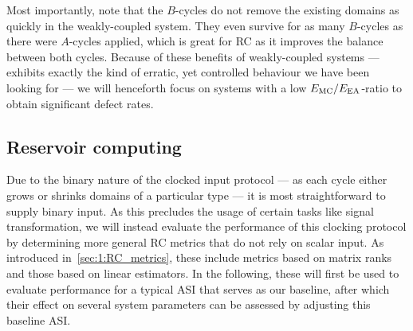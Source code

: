 \vspace{-1em}
\vspace{-1em}

Most importantly, note that the $B$-cycles do not remove the existing domains as quickly in the weakly-coupled system.
They even survive for as many $B$-cycles as there were $A$-cycles applied, which is great for RC as it improves the balance between both cycles.
Because of these benefits of weakly-coupled systems ---  exhibits exactly the kind of erratic, yet controlled behaviour we have been looking for --- we will henceforth focus on systems with a low $E_\mathrm{MC}/E_\mathrm{EA}$-ratio to obtain significant defect rates.

\subsection{Reservoir computing}
Due to the binary nature of the clocked input protocol --- as each cycle either grows or shrinks domains of a particular type --- it is most straightforward to supply binary input. %
As this precludes the usage of certain tasks like signal transformation, we will instead evaluate the performance of this clocking protocol by determining more general RC metrics that do not rely on scalar input.
As introduced in~\cref{sec:1:RC_metrics}, these include metrics based on matrix ranks and those based on linear estimators.
In the following, these will first be used to evaluate performance for a typical ASI that serves as our baseline, after which their effect on several system parameters can be assessed by adjusting this baseline ASI.

